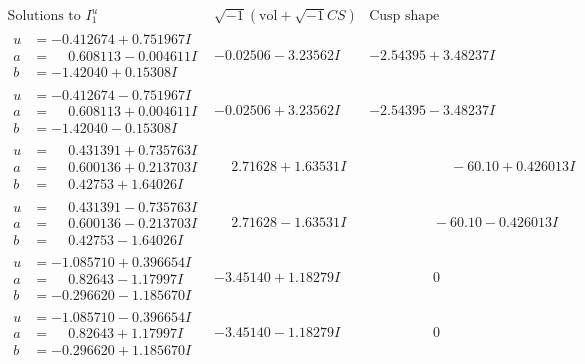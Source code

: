 \documentclass[1p]{elsarticle_modified}
\theoremstyle{definition}
\newcommand{\I}{\sqrt{-1}}
\begin{document}
$$\begin{array}{c|c|c}
\text{Solutions to }I^u_{1}& \I (\text{vol} + \sqrt{-1}CS) & \text{Cusp shape}\\
 \hline 
\begin{aligned}
u &= -0.412674 + 0.751967 I \\
a &= \phantom{-}0.608113 - 0.004611 I \\
b &= -1.42040 + 0.15308 I\end{aligned}
 & -0.02506 - 3.23562 I & -2.54395 + 3.48237 I \\ \hline\begin{aligned}
u &= -0.412674 - 0.751967 I \\
a &= \phantom{-}0.608113 + 0.004611 I \\
b &= -1.42040 - 0.15308 I\end{aligned}
 & -0.02506 + 3.23562 I & -2.54395 - 3.48237 I \\ \hline\begin{aligned}
u &= \phantom{-}0.431391 + 0.735763 I \\
a &= \phantom{-}0.600136 + 0.213703 I \\
b &= \phantom{-}0.42753 + 1.64026 I\end{aligned}
 & \phantom{-}2.71628 + 1.63531 I & \phantom{-0.000000 -}     -6
0. 10   + 0.426013 I \\ \hline\begin{aligned}
u &= \phantom{-}0.431391 - 0.735763 I \\
a &= \phantom{-}0.600136 - 0.213703 I \\
b &= \phantom{-}0.42753 - 1.64026 I\end{aligned}
 & \phantom{-}2.71628 - 1.63531 I & \phantom{-0.000000 }      -6
0. 10   - 0.426013 I \\ \hline\begin{aligned}
u &= -1.085710 + 0.396654 I \\
a &= \phantom{-}0.82643 - 1.17997 I \\
b &= -0.296620 - 1.185670 I\end{aligned}
 & -3.45140 + 1.18279 I & \phantom{-0.000000 } 0 \\ \hline\begin{aligned}
u &= -1.085710 - 0.396654 I \\
a &= \phantom{-}0.82643 + 1.17997 I \\
b &= -0.296620 + 1.185670 I\end{aligned}
 & -3.45140 - 1.18279 I & \phantom{-0.000000 } 0 \\ \hline\begin{aligned}

\end{aligned}
\end{array}$$
\end{document}
